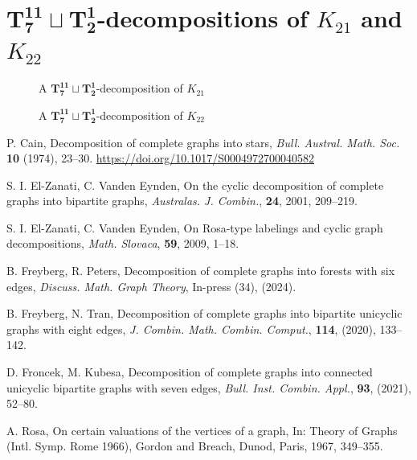 \documentclass{dmgt}
\begin{document}
\section{$\mathbf{T_{7}^{11}}\sqcup\mathbf{T_{2}^{1}}$-decompositions of $K_{21}$ and $K_{22}$}
\begin{figure}[H]
    
    \caption{A $\mathbf{T_{7}^{11}}\sqcup\mathbf{T_{2}^{1}}$-decomposition of $K_{21}$}
    \label{fig:K21}
\end{figure}
\begin{figure}[H]
    
    \caption{A $\mathbf{T_{7}^{11}}\sqcup\mathbf{T_{2}^{1}}$-decomposition of $K_{22}$}
    \label{fig:K22}
\end{figure}
\newpage
\begin{thebibliography}{20}

P. Cain, 
Decomposition of complete graphs into stars, 
\textit{Bull. Austral. Math. Soc.} \textbf{10} (1974), 23--30.
\url{https://doi.org/10.1017/S0004972700040582}

S. I. El-Zanati, C. Vanden Eynden,
On the cyclic decomposition of complete graphs into bipartite graphs,
\textit{Australas. J. Combin.}, \textbf{24}, 2001, 209--219.

S. I. El-Zanati, C. Vanden Eynden,
On Rosa-type labelings and cyclic graph decompositions,
\textit{Math. Slovaca}, \textbf{59}, 2009, 1--18.

B. Freyberg, R. Peters, 
Decomposition of complete graphs into forests with six edges, 
\textit{Discuss. Math. Graph Theory}, In-press (34), (2024).

B. Freyberg, N. Tran, 
Decomposition of complete graphs into bipartite unicyclic graphs with eight edges, 
\textit{J. Combin. Math. Combin. Comput.}, \textbf{114}, (2020), 133--142.

D. Froncek, M. Kubesa, 
Decomposition of complete graphs into connected unicyclic bipartite graphs with seven edges,
\textit{Bull. Inst. Combin. Appl.}, \textbf{93}, (2021), 52--80.

A. Rosa,
On certain valuations of the vertices of a graph,
In: Theory of Graphs (Intl. Symp. Rome 1966), Gordon and Breach, Dunod, Paris,
1967, 349--355.

\end{thebibliography}
\end{document}
